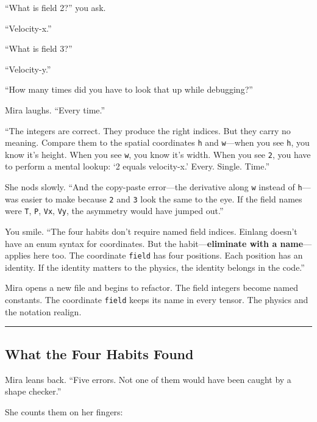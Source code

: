 \documentclass[11pt,]{article}
\begin{document}
``What is field 2?'' you ask.

``Velocity-x.''

``What is field 3?''

``Velocity-y.''

``How many times did you have to look that up while debugging?''

Mira laughs. ``Every time.''

``The integers are correct. They produce the right indices. But they
carry no meaning. Compare them to the spatial coordinates \texttt{h} and
\texttt{w}---when you see \texttt{h}, you know it's height. When you see
\texttt{w}, you know it's width. When you see \texttt{2}, you have to
perform a mental lookup: `2 equals velocity-x.' Every. Single. Time.''

She nods slowly. ``And the copy-paste error---the derivative along
\texttt{w} instead of \texttt{h}---was easier to make because \texttt{2}
and \texttt{3} look the same to the eye. If the field names were
\texttt{T}, \texttt{P}, \texttt{Vx}, \texttt{Vy}, the asymmetry would
have jumped out.''

You smile. ``The four habits don't require named field indices. Einlang
doesn't have an enum syntax for coordinates. But the
habit---\textbf{eliminate with a name}---applies here too. The
coordinate \texttt{field} has four positions. Each position has an
identity. If the identity matters to the physics, the identity belongs
in the code.''

Mira opens a new file and begins to refactor. The field integers become
named constants. The coordinate \texttt{field} keeps its name in every
tensor. The physics and the notation realign.

\begin{center}\rule{0.5\linewidth}{0.4pt}\end{center}

\hypertarget{what-the-four-habits-found}{%
\subsection{What the Four Habits
Found}\label{what-the-four-habits-found}}

Mira leans back. ``Five errors. Not one of them would have been caught
by a shape checker.''

She counts them on her fingers:
\end{document}
